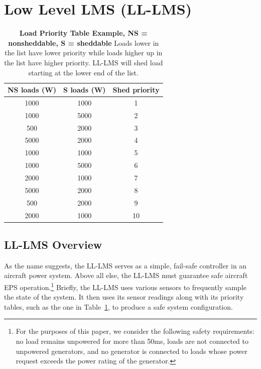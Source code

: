 \documentclass{acm_proc_article-sp}
\begin{document}
\section{Low Level LMS (LL-LMS)}
\label{sec:LL-LMS}
\begin{table}[t]
\caption{\textbf{Load Priority Table Example, NS = nonsheddable, S = sheddable} 
Loads lower in the list have lower priority while loads higher up in the list have
higher priority. LL-LMS will shed load starting at the lower end of the list.}
\label{T:shed}
\centering
\begin{tabular}{c|cc}
 NS loads (W) & S loads (W) & Shed priority \\ \hline
1000 & 1000 & 1 \\
1000 & 5000 & 2 \\
500 & 2000 & 3 \\
5000 & 2000 & 4 \\
1000 & 1000 & 5 \\
1000 & 5000 & 6 \\
2000 & 1000 & 7 \\
5000 & 2000 & 8 \\
500 & 2000 & 9 \\
2000 & 1000 & 10 \\ \hline
\end{tabular}
\end{table}

\subsection{LL-LMS Overview}
As the name suggests, the LL-LMS serves as a simple, fail-safe controller in an aircraft power system.
Above all else, the LL-LMS must guarantee safe aircraft EPS operation.\footnote{For the purposes of this paper, we consider the following safety requirements: no load remains unpowered for more than 50ms, loads are not connected to unpowered generators, and no generator is connected to loads whose power request exceeds the power rating of the generator.}
Briefly, the LL-LMS uses various sensors to frequently sample the state of the system. It then uses its sensor readings along with its
priority tables, such as the one in Table~\ref{T:shed}, to produce a safe system configuration.
\end{document}
